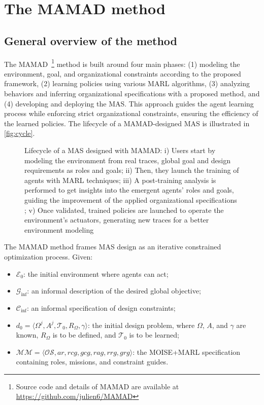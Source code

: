 \documentclass[pdflatex,sn-mathphys-num]{sn-jnl}%
\theoremstyle{thmstyleone}%
\theoremstyle{thmstyletwo}%
\theoremstyle{thmstylethree}%
\begin{document}
\section{The MAMAD method}\label{sec:mamad}

\subsection{General overview of the method}

The MAMAD~\footnote{Source code and details of MAMAD are available at \url{https://github.com/julien6/MAMAD}} method is built around four main phases: (1) modeling the environment, goal, and organizational constraints according to the proposed framework, (2) learning policies using various MARL algorithms, (3) analyzing behaviors and inferring organizational specifications with a proposed method, and (4) developing and deploying the MAS. This approach guides the agent learning process while enforcing strict organizational constraints, ensuring the efficiency of the learned policies. The lifecycle of a MAMAD-designed MAS is illustrated in \autoref{fig:cycle}.

\begin{figure}[h!]
    \centering
    
    \caption{Lifecycle of a MAS designed with MAMAD: i) Users start by modeling the environment from real traces, global goal and design requirements as roles and goals; \quad ii) Then, they launch the training of agents with MARL techniques; \quad iii) A post-training analysis is performed to get insights into the emergent agents' roles and goals, guiding the improvement of the applied organizational specifications ; \quad v) Once validated, trained policies are launched to operate the environment's actuators, generating new traces for a better environment modeling}
    \label{fig:cycle}
\end{figure}

The MAMAD method frames MAS design as an iterative constrained optimization process. Given:
\begin{itemize}
    \item $\mathcal{E}_0$: the initial environment where agents can act;
    \item $\mathcal{G}_{\text{inf}}$: an informal description of the desired global objective;
    \item $\mathcal{C}_{\text{inf}}$: an informal specification of design constraints;
    \item $d_0 = \langle \Omega^j, A^j, \mathcal{T}_0, R_{\Omega}, \gamma \rangle$: the initial design problem, where $\Omega$, $A$, and $\gamma$ are known, $R_{\Omega}$ is to be defined, and $\mathcal{T}_0$ is to be learned;
    \item $\mathcal{MM} = \langle \mathcal{OS}, ar, rcg, gcg, rag, rrg, grg \rangle$: the MOISE+MARL specification containing roles, missions, and constraint guides.
\end{itemize}
\end{document}
